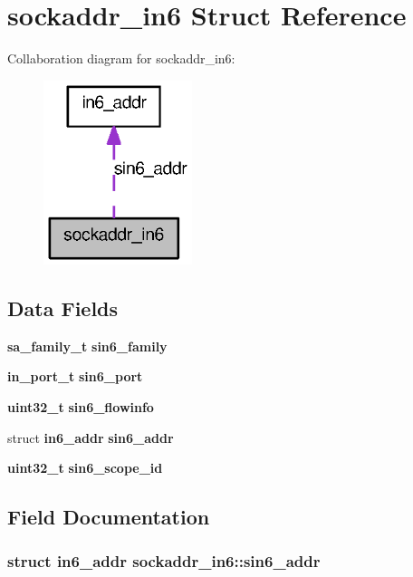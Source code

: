 \section{sockaddr\_\-in6 Struct Reference}
\label{structsockaddr__in6}


Collaboration diagram for sockaddr\_\-in6:
\nopagebreak
\begin{figure}[H]
\begin{center}
\leavevmode
\includegraphics[width=123pt]{structsockaddr__in6__coll__graph}
\end{center}
\end{figure}
\subsection*{Data Fields}
\begin{DoxyCompactItemize}
\item 
{\bf sa\_\-family\_\-t} {\bf sin6\_\-family}
\item 
{\bf in\_\-port\_\-t} {\bf sin6\_\-port}
\item 
{\bf uint32\_\-t} {\bf sin6\_\-flowinfo}
\item 
struct {\bf in6\_\-addr} {\bf sin6\_\-addr}
\item 
{\bf uint32\_\-t} {\bf sin6\_\-scope\_\-id}
\end{DoxyCompactItemize}


\subsection{Field Documentation}
\subsubsection[{sin6\_\-addr}]{\setlength{\rightskip}{0pt plus 5cm}struct {\bf in6\_\-addr} {\bf sockaddr\_\-in6::sin6\_\-addr}}\label{structsockaddr__in6_a219e7f3ecd6d7dcf8fc2465475be490f}
